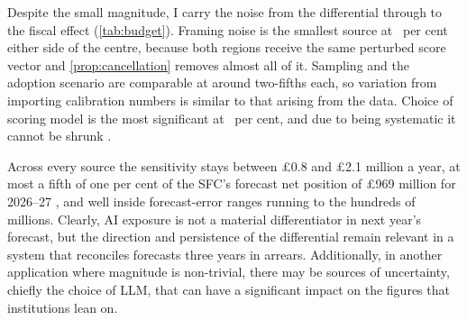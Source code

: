 Despite the small magnitude, I carry the noise from the differential through to the fiscal effect (\cref{tab:budget}).
Framing noise is the smallest source at \fiscNoisePct~per cent either side of the centre, because both regions receive the same perturbed score vector and \cref{prop:cancellation} removes almost all of it. Sampling and the adoption scenario are comparable at around two-fifths each, so variation from importing calibration numbers is similar to that arising from the data. Choice of scoring model is the most significant at \fiscModelPct~per cent, and due to being systematic it cannot be shrunk \citep{yin2026}. 

Across every source the sensitivity stays between \pounds0.8 and \pounds2.1 million a year, at most a fifth of one per cent of the SFC's forecast net position of \pounds969 million for 2026--27 \citep{sfc2026}, and well inside forecast-error ranges running to the hundreds of millions. Clearly, AI exposure is not a material differentiator in next year's forecast, but the direction and persistence of the differential remain relevant in a system that reconciles forecasts three years in arrears. 
Additionally, in another application where magnitude is non-trivial, there may be sources of uncertainty, 
chiefly the choice of LLM, that can have a significant impact on the figures that institutions lean on.


